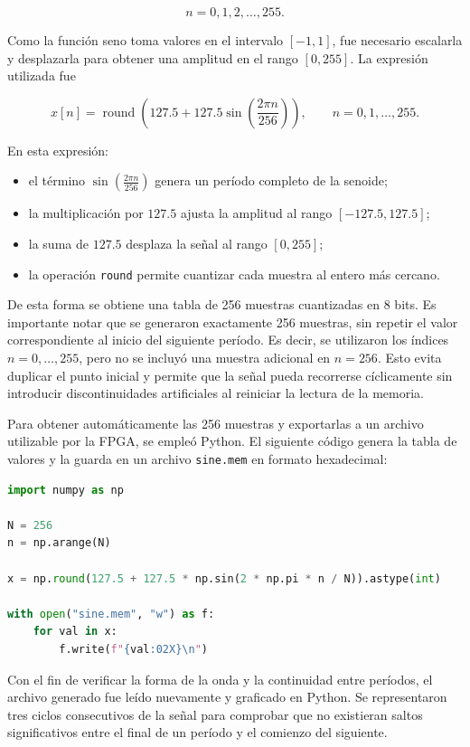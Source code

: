 \documentclass[letterpaper, 12pt]{article}
\begin{document}
\[
n = 0,1,2,\dots,255.
\]

Como la función seno toma valores en el intervalo $[-1,1]$, fue necesario escalarla y desplazarla para obtener una amplitud en el rango $[0,255]$. La expresión utilizada fue

\[
x[n] = \operatorname{round}\left(127.5 + 127.5 \sin\left(\frac{2\pi n}{256}\right)\right), \qquad n=0,1,\dots,255.
\]

En esta expresión:
\begin{itemize}
    \item el término $\sin\left(\frac{2\pi n}{256}\right)$ genera un período completo de la senoide;
    \item la multiplicación por $127.5$ ajusta la amplitud al rango $[-127.5,127.5]$;
    \item la suma de $127.5$ desplaza la señal al rango $[0,255]$;
    \item la operación \texttt{round} permite cuantizar cada muestra al entero más cercano.
\end{itemize}

De esta forma se obtiene una tabla de 256 muestras cuantizadas en 8 bits.
Es importante notar que se generaron exactamente 256 muestras, sin repetir el valor correspondiente al inicio del siguiente período. Es decir, se utilizaron los índices $n=0,\dots,255$, pero no se incluyó una muestra adicional en $n=256$. Esto evita duplicar el punto inicial y permite que la señal pueda recorrerse cíclicamente sin introducir discontinuidades artificiales al reiniciar la lectura de la memoria.

Para obtener automáticamente las 256 muestras y exportarlas a un archivo utilizable por la FPGA, se empleó Python. El siguiente código genera la tabla de valores y la guarda en un archivo \texttt{sine.mem} en formato hexadecimal:
\begin{lstlisting}[language=Python, caption={Generación del archivo \texttt{sine.mem}}]
import numpy as np

N = 256
n = np.arange(N)

x = np.round(127.5 + 127.5 * np.sin(2 * np.pi * n / N)).astype(int)

with open("sine.mem", "w") as f:
    for val in x:
        f.write(f"{val:02X}\n")
\end{lstlisting}
Con el fin de verificar la forma de la onda y la continuidad entre períodos, el archivo generado fue leído nuevamente y graficado en Python. Se representaron tres ciclos consecutivos de la señal para comprobar que no existieran saltos significativos entre el final de un período y el comienzo del siguiente.
\end{document}
